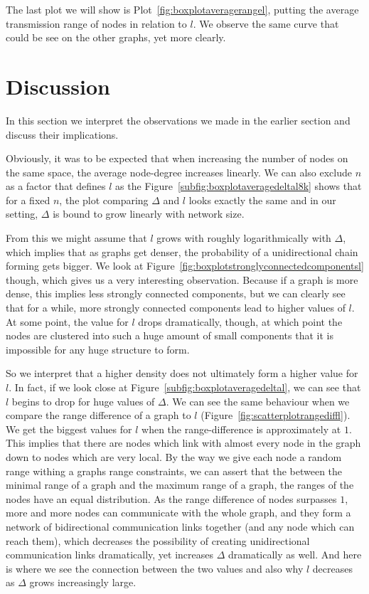 The last plot we will show is Plot~\ref{fig:boxplotaveragerangel}, putting the average transmission range of nodes in relation to $l$. We observe the same curve that could be see on the other graphs, yet more clearly.


\newpage
\section{Discussion}

In this section we interpret the observations we made in the earlier section and discuss their implications.


Obviously, it was to be expected that when increasing the number of nodes on the same space, the average node-degree increases linearly. We can also exclude $n$ as a factor that defines $l$ as the Figure~\ref{subfig:boxplotaveragedeltal8k} shows that for a fixed $n$, the plot comparing $\Delta$ and $l$ looks exactly the same and in our setting, $\Delta$ is bound to grow linearly with network size.

From this we might assume that $l$ grows with roughly logarithmically with $\Delta$, which implies that as graphs get denser, the probability of a unidirectional chain forming gets bigger. We look at Figure~\ref{fig:boxplotstronglyconnectedcomponentsl} though, which gives us a very interesting observation. Because if a graph is more dense, this implies less strongly connected components, but we can clearly see that for a while, more strongly connected components lead to higher values of $l$. At some point, the value for $l$ drops dramatically, though, at which point the nodes are clustered into such a huge amount of small components that it is impossible for any huge structure to form.

So we interpret that a higher density does not ultimately form a higher value for $l$. In fact, if we look close at Figure~\ref{subfig:boxplotaveragedeltal}, we can see that $l$ begins to drop for huge values of $\Delta$. We can see the same behaviour when we compare the range difference of a graph to $l$ (Figure~\ref{fig:scatterplotrangediffl}). We get the biggest values for $l$ when the range-difference is approximately at $1$. This implies that there are nodes which link with almost every node in the graph down to nodes which are very local. By the way we give each node a random range withing a graphs range constraints, we can assert that the between the minimal range of a graph and the maximum range of a graph, the ranges of the nodes have an equal distribution. As the range difference of nodes surpasses $1$, more and more nodes can communicate with the whole graph, and they form a network of bidirectional communication links together (and any node which can reach them), which decreases the possibility of creating unidirectional communication links dramatically, yet increases $\Delta$ dramatically as well. And here is where we see the connection between the two values and also why $l$ decreases as $\Delta$ grows increasingly large.

